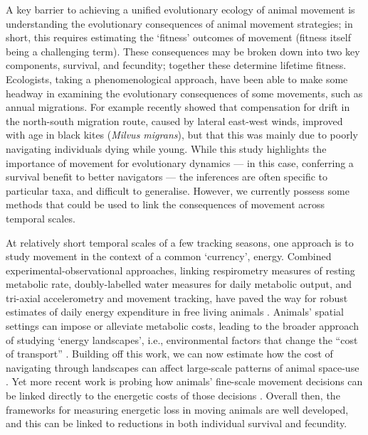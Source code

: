 A key barrier to achieving a unified evolutionary ecology of animal movement is understanding the evolutionary consequences of animal movement strategies; in short, this requires estimating the `fitness' outcomes of movement (fitness itself being a challenging term).
These consequences may be broken down into two key components, survival, and fecundity; together these determine lifetime fitness.
Ecologists, taking a phenomenological approach, have been able to make some headway in examining the evolutionary consequences of some movements, such as annual migrations.
For example \textcite{sergio2022} recently showed that compensation for drift in the north-south migration route, caused by lateral east-west winds, improved with age in black kites (\emph{Milvus migrans}), but that this was mainly due to poorly navigating individuals dying while young.
While this study highlights the importance of movement for evolutionary dynamics --- in this case, conferring a survival benefit to better navigators --- the inferences are often specific to particular taxa, and difficult to generalise.
However, we currently possess some methods that could be used to link the consequences of movement across temporal scales.

At relatively short temporal scales of a few tracking seasons, one approach is to study movement in the context of a common `currency', energy.
Combined experimental-observational approaches, linking respirometry measures of resting metabolic rate, doubly-labelled water measures for daily metabolic output, and tri-axial accelerometry and movement tracking, have paved the way for robust estimates of daily energy expenditure in free living animals \parencite{stothart2016}.
Animals' spatial settings can impose or alleviate metabolic costs, leading to the broader approach of studying `energy landscapes', i.e., environmental factors that change the ``cost of transport'' \parencite{shepard2013}.
Building off this work, we can now estimate how the cost of navigating through landscapes can affect large-scale patterns of animal space-use \parencite[e.g.][]{gallagher2017}.
Yet more recent work is probing how animals' fine-scale movement decisions can be linked directly to the energetic costs of those decisions \parencite{klappstein2022}.
Overall then, the frameworks for measuring energetic loss in moving animals are well developed, and this can be linked to reductions in both individual survival and fecundity.

